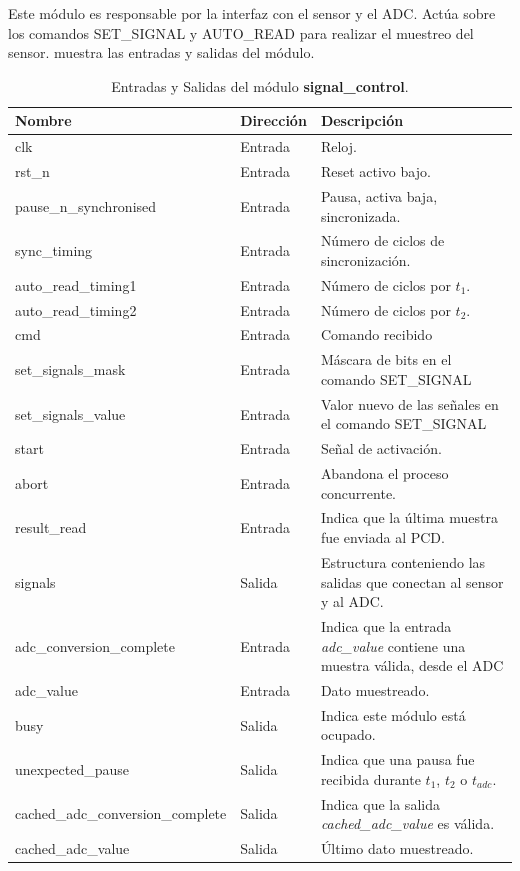 \documentclass[a4paper, twoside, 11pt]{report}
\begin{document}
Este módulo es responsable por la interfaz con el sensor y el ADC. Actúa sobre los comandos SET\_SIGNAL y AUTO\_READ para realizar el muestreo del sensor.  muestra las entradas y salidas del módulo.

\begin{table}[htb]
  \centering
  \tablezebra
  \begin{tabulary}{\linewidth}{l|l|L}
    \setcounter{rownum}{0}
    \textbf{Nombre}&\textbf{Dirección}&\textbf{Descripción} \\
    \hline
    clk&Entrada&Reloj. \\
    rst\_n&Entrada&Reset activo bajo. \\
    pause\_n\_synchronised&Entrada&Pausa, activa baja, sincronizada. \\
    sync\_timing&Entrada&Número de ciclos de sincronización. \\
    auto\_read\_timing1&Entrada&Número de ciclos por $t_1$. \\
    auto\_read\_timing2&Entrada&Número de ciclos por $t_2$. \\
    cmd&Entrada&Comando recibido \\
    set\_signals\_mask&Entrada&Máscara de bits en el comando SET\_SIGNAL \\
    set\_signals\_value&Entrada&Valor nuevo de las señales en el comando SET\_SIGNAL \\
    start&Entrada&Señal de activación. \\
    abort&Entrada&Abandona el proceso concurrente. \\
    result\_read&Entrada&Indica que la última muestra fue enviada al PCD. \\
    signals&Salida&Estructura conteniendo las salidas que conectan al sensor y al ADC. \\
    adc\_conversion\_complete&Entrada&Indica que la entrada \textit{adc\_value} contiene una muestra válida, desde el ADC \\
    adc\_value&Entrada&Dato muestreado. \\
    busy&Salida&Indica este módulo está ocupado. \\
    unexpected\_pause&Salida&Indica que una pausa fue recibida durante $t_1$, $t_2$ o $t_{adc}$. \\
    cached\_adc\_conversion\_complete&Salida&Indica que la salida \textit{cached\_adc\_value} es válida. \\
    cached\_adc\_value&Salida&Último dato muestreado. \\
  \end{tabulary}
  \caption{Entradas y Salidas del módulo \textbf{signal\_control}.}
  \label{tab:ports_signal_control}
\end{table}
\end{document}
